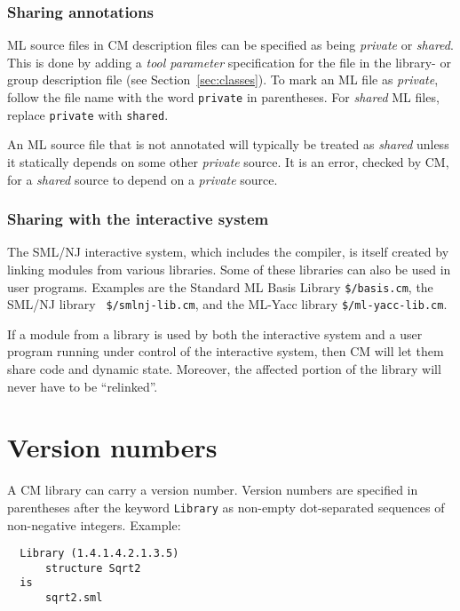\documentclass[titlepage,letterpaper]{article}
\begin{document}

\subsubsection*{Sharing annotations}

ML source files in CM description files can be specified as being {\em
private} or {\em shared}.  This is done by adding a {\em tool
parameter} specification for the file in the library- or group
description file (see Section~\ref{sec:classes}). To mark an ML file
as {\em private}, follow the file name with the word {\tt private} in
parentheses.  For {\em shared} ML files, replace {\tt private} with
{\tt shared}.

An ML source file that is not annotated will typically be treated as
{\em shared} unless it statically depends on some other {\em private}
source.  It is an error, checked by CM, for a {\em shared} source to
depend on a {\em private} source.

\subsubsection*{Sharing with the interactive system}

The SML/NJ interactive system, which includes the compiler, is itself
created by linking modules from various libraries. Some of these
libraries can also be used in user programs.  Examples are the
Standard ML Basis Library {\tt \$/basis.cm}, the SML/NJ library {\tt
\$/smlnj-lib.cm}, and the ML-Yacc library {\tt \$/ml-yacc-lib.cm}.

If a module from a library is used by both the interactive system and
a user program running under control of the interactive system, then
CM will let them share code and dynamic state.  Moreover, the affected
portion of the library will never have to be ``relinked''.

\section{Version numbers}
\label{sec:versions}

A CM library can carry a version number.  Version numbers are
specified in parentheses after the keyword {\tt Library} as non-empty
dot-separated sequences of non-negative integers.  Example:

\begin{verbatim}
  Library (1.4.1.4.2.1.3.5)
      structure Sqrt2
  is
      sqrt2.sml
\end{verbatim}
\end{document}
